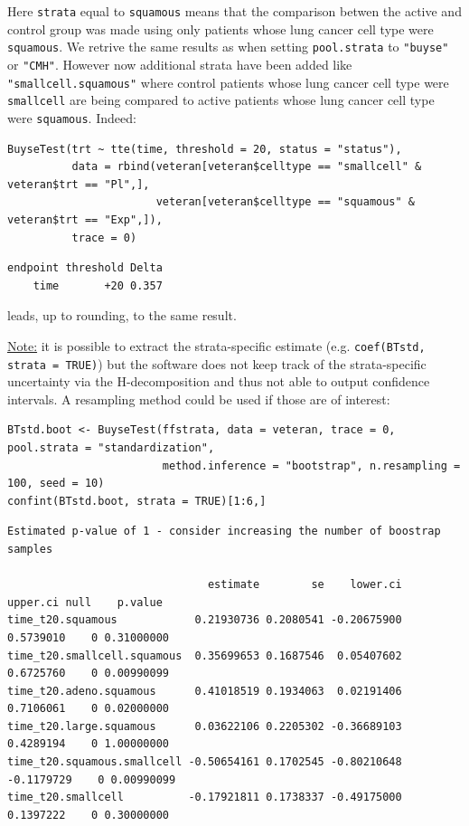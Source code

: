 \documentclass[12pt]{article}
\begin{document}
Here \texttt{strata} equal to \texttt{squamous} means that the comparison betwen the
active and control group was made using only patients whose lung
cancer cell type were \texttt{squamous}. We retrive the same results as when
setting \texttt{pool.strata} to \texttt{"buyse"} or \texttt{"CMH"}. However now additional
strata have been added like \texttt{"smallcell.squamous"} where control
patients whose lung cancer cell type were \texttt{smallcell} are being
compared to active patients whose lung cancer cell type were
\texttt{squamous}. Indeed:
\lstset{language=r,label= ,caption= ,captionpos=b,numbers=none}
\begin{lstlisting}
BuyseTest(trt ~ tte(time, threshold = 20, status = "status"),
          data = rbind(veteran[veteran$celltype == "smallcell" & veteran$trt == "Pl",],
                       veteran[veteran$celltype == "squamous" & veteran$trt == "Exp",]),
          trace = 0)
\end{lstlisting}

\begin{verbatim}
endpoint threshold Delta
    time       +20 0.357
\end{verbatim}


leads, up to rounding, to the same result.

\clearpage

\uline{Note:} it is possible to extract the strata-specific estimate
(e.g. \texttt{coef(BTstd, strata = TRUE)}) but the software does not keep
track of the strata-specific uncertainty via the H-decomposition and
thus not able to output confidence intervals. A resampling method
could be used if those are of interest: \newline

\lstset{language=r,label= ,caption= ,captionpos=b,numbers=none}
\begin{lstlisting}
BTstd.boot <- BuyseTest(ffstrata, data = veteran, trace = 0, pool.strata = "standardization",
                        method.inference = "bootstrap", n.resampling = 100, seed = 10)
confint(BTstd.boot, strata = TRUE)[1:6,]
\end{lstlisting}

\begin{verbatim}
Estimated p-value of 1 - consider increasing the number of boostrap samples 

                               estimate        se    lower.ci   upper.ci null    p.value
time_t20.squamous            0.21930736 0.2080541 -0.20675900  0.5739010    0 0.31000000
time_t20.smallcell.squamous  0.35699653 0.1687546  0.05407602  0.6725760    0 0.00990099
time_t20.adeno.squamous      0.41018519 0.1934063  0.02191406  0.7106061    0 0.02000000
time_t20.large.squamous      0.03622106 0.2205302 -0.36689103  0.4289194    0 1.00000000
time_t20.squamous.smallcell -0.50654161 0.1702545 -0.80210648 -0.1179729    0 0.00990099
time_t20.smallcell          -0.17921811 0.1738337 -0.49175000  0.1397222    0 0.30000000
\end{verbatim}
\end{document}
